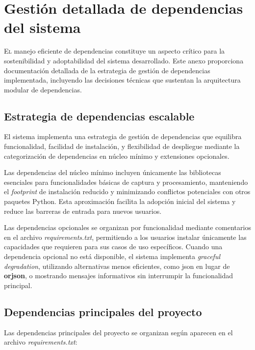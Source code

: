 \chapter[Gestión de dependencias]{Gestión detallada de dependencias del sistema}
\label{chap:dependencias_detalladas}

\lettrine{E}{l} manejo eficiente de dependencias constituye un aspecto crítico para la sostenibilidad y adoptabilidad del sistema desarrollado. Este anexo proporciona documentación detallada de la estrategia de gestión de dependencias implementada, incluyendo las decisiones técnicas que sustentan la arquitectura modular de dependencias.

\section{Estrategia de dependencias escalable}
\label{sec:estrategia_dependencias}

El sistema implementa una estrategia de gestión de dependencias que equilibra funcionalidad, facilidad de instalación, y flexibilidad de despliegue mediante la categorización de dependencias en núcleo mínimo y extensiones opcionales.

Las dependencias del núcleo mínimo incluyen únicamente las bibliotecas esenciales para funcionalidades básicas de captura y procesamiento, manteniendo el \textit{footprint} de instalación reducido y minimizando conflictos potenciales con otros paquetes Python. Esta aproximación facilita la adopción inicial del sistema y reduce las barreras de entrada para nuevos usuarios.

Las dependencias opcionales se organizan por funcionalidad mediante comentarios en el archivo \textit{requirements.txt}, permitiendo a los usuarios instalar únicamente las capacidades que requieren para sus casos de uso específicos. Cuando una dependencia opcional no está disponible, el sistema implementa \textit{graceful degradation}, utilizando alternativas menos eficientes, como \acrshort{json} en lugar de \textbf{orjson}, o mostrando mensajes informativos sin interrumpir la funcionalidad principal.

\section{Dependencias principales del proyecto}
\label{sec:dependencias_principales}

Las dependencias principales del proyecto se organizan según aparecen en el archivo \textit{requirements.txt}:

